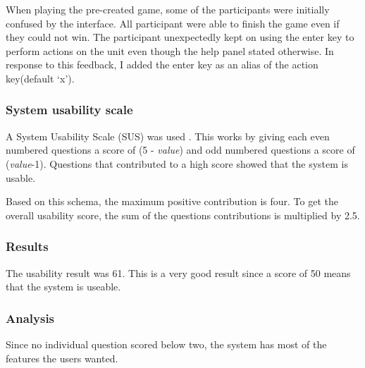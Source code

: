 When playing the pre-created game, some of the participants were initially confused by the interface. All participant were able to finish the game even if they could not win.  The participant unexpectedly kept on using the enter key to perform actions on the unit even though the help panel stated otherwise. In response to this feedback, I added the enter key as an alias of the action key(default `x').

\subsubsection{System usability scale}
A System Usability Scale (SUS) was used \cite{SUS}. This works by giving each even numbered questions a score of (5 - \emph{value}) and odd numbered questions a score of (\emph{value}-1). Questions that contributed to a high score showed that the system is usable. 

Based on this schema, the maximum positive contribution is four. To get the overall usability score, the sum of the questions contributions is multiplied by 2.5. 

\subsubsection{Results}
The usability result was 61. This is a very good result since a score of 50 means that the system is useable. 

\subsubsection{Analysis}
Since no individual question scored below two, the system has most of the features the users wanted.